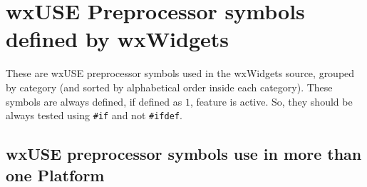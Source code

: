
\section{wxUSE Preprocessor symbols defined by wxWidgets}\label{wxusedef}

These are wxUSE preprocessor symbols used in the wxWidgets source, grouped
by category (and sorted by alphabetical order inside each category). 
These symbols are always defined, if defined as $1$, feature is active.
So, they should be always tested using \texttt{#if} and not 
\texttt{#ifdef}.

\subsection{wxUSE preprocessor symbols use in more than one Platform}\label{wxusedefmulti}

